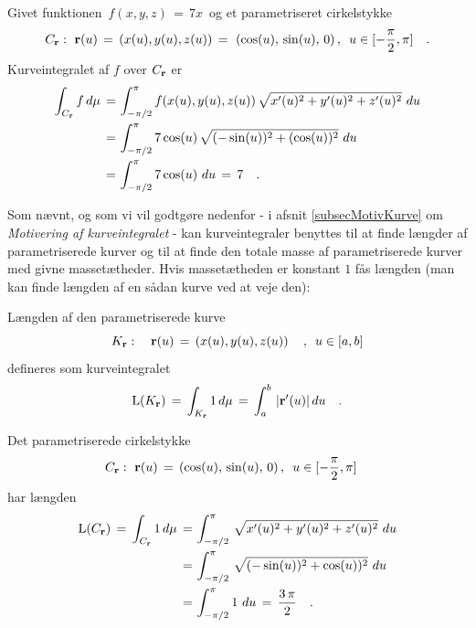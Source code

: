 \begin{example}\label{exKurve1}
Givet funktionen $\,f(x, y, z)\, = \, 7x\,$ og et parametriseret
cirkelstykke
$$C_{\bf r}: \,\, {\bf r}(u) \, = \, \left(x(u), y(u), z(u)\right) \, = \,
\, \left(\cos(u), \,\sin(u),\, 0\right), \, \, \,  u \in
[-\dfrac{\pi}{2}, \pi] \quad.$$ Kurveintegralet af $f$ over
$C_{\bf r}$ er
\begin{equation*}
\begin{aligned}
\int_{C_{\bf r}} f \, d\mu \, = \, &\int_{-\pi/2}^{\pi} f(x(u),
y(u), z(u) )\,\sqrt{x'(u)^{2} + y'(u)^{2} + z'(u)^{2}}\,\,du \\
\, = \, &\int_{-\pi/2}^{\pi} 7\cos(u)\,\sqrt{(-\sin(u))^{2} +
(\cos(u))^{2}}\,\,du \\
  \, = \, &\int_{-\pi/2}^{\pi} 7\cos(u)\,\,du
  \, =
\, 7 \quad.
\end{aligned}
\end{equation*}
\end{example}







Som nævnt, og som vi vil godtgøre nedenfor - i afsnit \ref{subsecMotivKurve} om {\em
Motivering af kurveintegralet} - kan kurveintegraler benyttes til
at finde længder af parametriserede kurver og til at finde den
totale masse af parametriserede kurver med givne massetætheder.
Hvis massetætheden er konstant $1$ fås længden (man kan finde
længden af en sådan kurve ved at veje den):

\begin{definition} \label{defLaengde}
{Længden} af den parametriserede kurve
\begin{equation*}
K_{\bf r}: \quad {\bf r}(u) \, = \, \left(x(u), y(u), z(u)\right)
\quad , \, \, \,  u \in [a,b]
\end{equation*}
defineres som kurveintegralet
\begin{equation}
\operatorname{L}(K_{\bf r}) \, = \, \int_{K_{\bf r}} 1 \, d\mu \, = \,
\int_{a}^{b} \, | {\bf r}'(u) | \,du \quad.
\end{equation}
\end{definition}


\begin{example}\label{exKurve2}
Det parametriserede {cirkelstykke}
\begin{equation*}
C_{\bf r}: \,\, {\bf r}(u) \, =
\, \left(\cos(u), \,\sin(u),\, 0\right), \, \, \, u \in
[-\frac{\pi}{2}, \pi] \quad \end{equation*} har længden
\begin{equation*}
\begin{aligned}
\operatorname{L}(C_{\bf r}) \, = \, \int_{C_{\bf r}} 1 \, d\mu \, = \,
&\int_{-\pi/2}^{\pi} \,\sqrt{x'(u)^{2} + y'(u)^{2} + z'(u)^{2}}\,\,du \\
\, = \, &\int_{-\pi/2}^{\pi}\,\sqrt{(-\sin(u))^{2} +
\cos(u))^{2}}\,\,du \\
  \, = \, &\int_{-\pi/2}^{\pi} 1\,\,du
  \, =
\, \frac{3\,\pi}{2} \quad.
\end{aligned}
\end{equation*}
\end{example}

